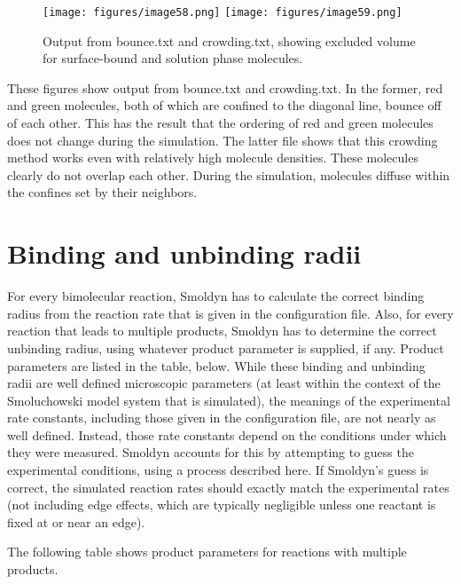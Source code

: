 \documentclass {scrbook}
\begin{document}
\begin{figure}[h]
\centering
\texttt{[image: figures/image58.png]}
\texttt{[image: figures/image59.png]}
\caption{Output from bounce.txt and crowding.txt, showing excluded volume for surface-bound and solution phase molecules.}
\label{fig:crowding}
\end{figure}

These figures show output from bounce.txt and crowding.txt. In the former, red and green molecules, both of which are confined to the diagonal line, bounce off of each other. This has the result that the ordering of red and green molecules does not change during the simulation. The latter file shows that this crowding method works even with relatively high molecule densities. These molecules clearly do not overlap each other. During the simulation, molecules diffuse within the confines set by their neighbors.

\section{Binding and unbinding radii}

For every bimolecular reaction, Smoldyn has to calculate the correct binding radius from the reaction rate that is given in the configuration file. Also, for every reaction that leads to multiple products, Smoldyn has to determine the correct unbinding radius, using whatever product parameter is supplied, if any. Product parameters are listed in the table, below. While these binding and unbinding radii are well defined microscopic parameters (at least within the context of the Smoluchowski model system that is simulated), the meanings of the experimental rate constants, including those given in the configuration file, are not nearly as well defined. Instead, those rate constants depend on the conditions under which they were measured. Smoldyn accounts for this by attempting to guess the experimental conditions, using a process described here. If Smoldyn's guess is correct, the simulated reaction rates should exactly match the experimental rates (not including edge effects, which are typically negligible unless one reactant is fixed at or near an edge).

The following table shows product parameters for reactions with multiple products.
\end{document}
